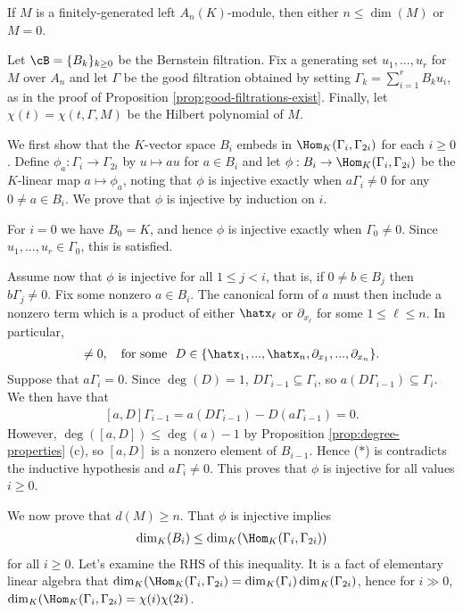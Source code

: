 \begin{thm}\label{thm:bern-inequality}
	If $M$ is a finitely-generated left $A_n(K)$-module, then either $n \leq \dim(M)$ or $M = 0$.
\end{thm}
\begin{prf}
	Let $\cB = \{B_k\}_{k\geq 0}$ be the Bernstein filtration. Fix a generating set $u_1,...,u_r$ for $M$ over $A_n$ and let $\Gamma$ be the good filtration obtained by setting $\Gamma_k = \sum_{i=1}^r B_ku_i$, as in the proof of Proposition \ref{prop:good-filtrations-exist}. Finally, let $\chi(t) = \chi(t,\Gamma, M)$ be the Hilbert polynomial of $M$.

	We first show that the $K$-vector space $B_i$ embeds in $\Hom_K(\Gamma_i, \Gamma_{2i})$ for each $i \geq 0$. Define $\phi_a:\Gamma_i\to \Gamma_{2i}$ by $u\mapsto au$ for $a \in B_i$ and let $\phi:B_i\to \Hom_K(\Gamma_i,\Gamma_{2i})$ be the $K$-linear map $a\mapsto \phi_a$, noting that $\phi$ is injective exactly when $a\Gamma_i \neq 0$ for any $0 \neq a \in B_i$. We prove that $\phi$ is injective by induction on $i$.

	For $i = 0$ we have $B_0 = K$, and hence $\phi$ is injective exactly when $\Gamma_0 \neq 0$. Since $u_1,...,u_r \in \Gamma_0$, this is satisfied.

	Assume now that $\phi$ is injective for all $1\leq j <i$, that is, if $0 \neq b \in B_{j}$ then $b\Gamma_j\neq 0$. Fix some nonzero $a \in B_i$. The canonical form of $a$ must then include a nonzero term which is a product of either $\hatx_\ell$ or $\partial_{x_\ell}$ for some $1\leq \ell\leq n$. In particular,
	\begin{align*}
		[a,D] \neq 0, \hspace{1em} \text{for some } ~ D \in \{\hatx_1,...,\hatx_n,\partial_{x_1},...,\partial_{x_n}\}.
	\end{align*}
	Suppose that $a\Gamma_i = 0$. Since $\deg(D) = 1$, $D\Gamma_{i-1} \subseteq \Gamma_{i}$, so $a(D\Gamma_{i-1}) \subseteq \Gamma_{i}$. We then have that
	\begin{align}\tag{$\ast$}
		[a,D]\Gamma_{i-1} = a(D\Gamma_{i-1}) - D(a\Gamma_{i-1}) = 0.
	\end{align}
	However, $\deg([a,D]) \leq \deg(a) - 1$ by Proposition \ref{prop:degree-properties} (c), so $[a,D]$ is a nonzero element of $B_{i-1}$. Hence ($\ast$) is contradicts the inductive hypothesis and $a\Gamma_i \neq 0$. This proves that $\phi$ is injective for all values $i \geq 0$.

	We now prove that $d(M) \geq n$. That $\phi$ is injective implies
	\begin{align*}
		\dim_K(B_i) \leq \dim_K(\Hom_K(\Gamma_i,\Gamma_{2i}))
	\end{align*}
	for all $i \geq 0$. Let's examine the RHS of this inequality. It is a fact of elementary linear algebra that $\dim_K(\Hom_K(\Gamma_i,\Gamma_{2i}) = \dim_K(\Gamma_i)\dim_K(\Gamma_{2i})$, hence for $i \gg 0$, $\dim_K(\Hom_K(\Gamma_i,\Gamma_{2i}) = \chi(i)\chi(2i)$.


\end{prf}
